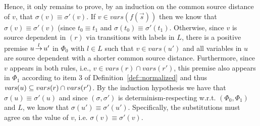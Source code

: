 Hence, it only remains to prove, by an induction on the common source distance of $v$, that $\sigma(v) \equiv \sigma'(v)$.
If $v\in vars(f(\overrightarrow s))$ then we know that $\sigma(v) \equiv \sigma'(v)$ (since $t_0 \equiv t_1$ and $\sigma(t_0) \equiv \sigma'(t_1)$.
Otherwise, since $v$ is source dependent in $(r)$
via transitions with labels in $L$,
there is a positive premise
$u \,{\stackrel{{l}}{\rightarrow}}\, u'$ in $\Phi_0$ with $l\in L$
such that $v\in vars(u')$ and all variables in $u$ are source
dependent with a shorter common source distance.
Furthermore,
since $v$ appears in both rules, i.e., $v \in vars(r) \cap vars(r')$,
this premise also appears in $\Phi_1$ according
to item 3 of Definition~\ref{def::normalized} and thus $\mathit{vars}(u) \subseteq vars(r) \cap vars(r')$.
By the induction hypothesis we have that $\sigma(u)\equiv \sigma'(u)$ and since $(\sigma,\sigma')$
is determinism-respecting w.r.t. $(\Phi_0, \Phi_1)$ and $L$, we know that
$\sigma(u') \equiv \sigma'(u')$. Specifically, the substitutions
must agree on the value of $v$, i.e.
$\sigma(v) \equiv \sigma'(v)$.